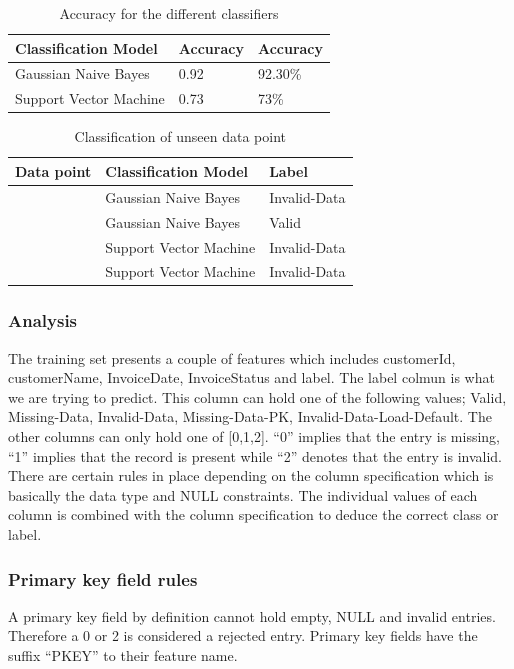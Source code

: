 \documentclass[12pt, letterpaper, titlepage]{report}
\begin{document}
\begin{table}[h!]
	\centering
	\begin{tabular}{|l|l|l|}
		\hline
		\textbf{Classification Model} & \textbf{Accuracy} & \textbf{Accuracy} \\ \hline
			Gaussian Naive Bayes   &     0.92    &     92.30\%  \\ \hline
			Support Vector Machine  &    0.73    &     73\%  \\ \hline
	\end{tabular}
		\caption{Accuracy for the different classifiers}
		\label{tab_accuracyScore}
\end{table}


\begin{table}[h!]
	\centering
	\begin{tabular}{|l|l|l|}
		\hline
		\textbf{Data point} & \textbf{Classification Model} & \textbf{Label} \\ \hline
		[2,0,0,1] & Gaussian Naive Bayes   &     Invalid-Data \\ \hline
		[1,1,1,1] & Gaussian Naive Bayes   &     Valid \\ \hline
		[2,0,0,1] & Support Vector Machine  &    Invalid-Data \\ \hline
		[1,1,1,1] & Support Vector Machine  &    Invalid-Data \\ \hline
	\end{tabular}
	\caption{Classification of unseen data point}
	\label{tab_prediction}
\end{table}
	
\subsubsection{Analysis}

The training set presents a couple of features which includes customerId, customerName, InvoiceDate, InvoiceStatus and label. The label colmun is what we are trying to predict. This column can hold one of the following values; Valid, Missing-Data, Invalid-Data, Missing-Data-PK, Invalid-Data-Load-Default. The other columns can only hold one of [0,1,2]. “0” implies that the entry is missing, “1” implies that the record is present while “2” denotes that the entry is invalid. There are certain rules in place depending on the column specification which is basically the data type and NULL constraints.  The individual values of each column is combined with the column specification to deduce the correct class or label. 

\subsubsection*{Primary key field rules}
A primary key field by definition cannot hold empty, NULL and invalid entries. Therefore a 0 or 2 is considered a rejected entry. Primary key fields have the suffix “PKEY” to their feature name.
\end{document}
